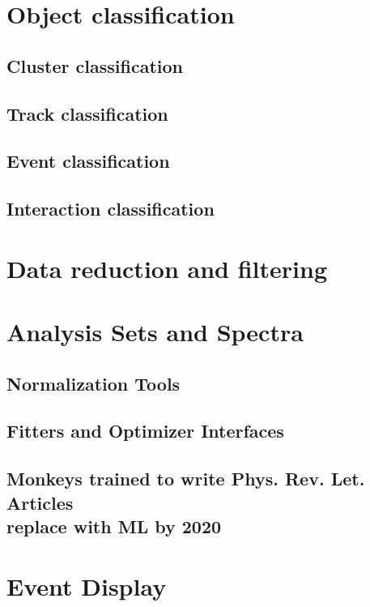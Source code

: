 \section{Object classification}
\subsection{Cluster classification}
\subsection{Track classification}
\subsection{Event classification}
\subsection{Interaction classification}

\section{Data reduction and filtering}

\section{Analysis Sets and Spectra}
\subsection{Normalization Tools}
\subsection{Fitters and Optimizer Interfaces}
\subsection{Monkeys trained to write Phys. Rev. Let. Articles\\ replace with ML by 2020}

\section{Event Display}  %
